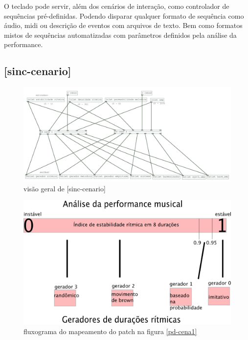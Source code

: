 \documentclass{ppgmus}
\begin{document}
O teclado pode servir, além dos cenários de interação, como controlador
de sequências pré-definidas. Podendo disparar qualquer formato de sequência como
áudio, midi ou descrição de eventos com arquivos de texto. Bem como formatos mistos
de sequências automatizadas com parâmetros definidos pela análise da performance.



\subsection{[sinc-cenario]}

\begin{figure}[-h]
\includegraphics[scale=.4]{sinc-cenario}
\caption{visão geral de [sinc-cenario]}
\label{sinc-cenario}
\end{figure}

\begin{figure}[-h]
\includegraphics[scale=.4]{tabela-cenario}
\caption{fluxograma do mapeamento do patch na figura \ref{pd-cena1}}
\label{tabela-cenario}
\end{figure}
\end{document}
